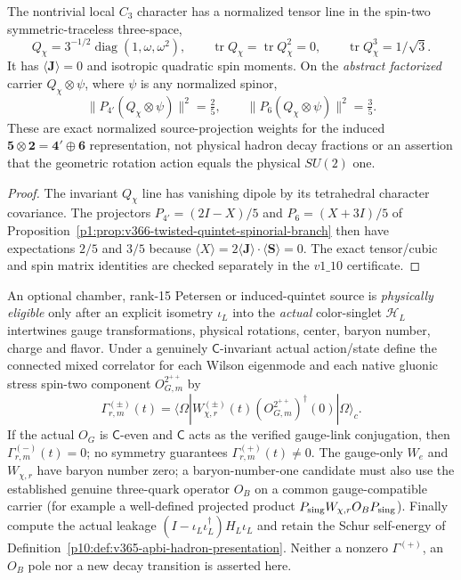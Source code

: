 \documentclass[12pt,a4paper]{article}
\begin{document}
\begin{proposition}
\label{p10:prop:v366-hurwitz-spin2-character-source}
The nontrivial local $C_3$ character has a normalized tensor line
in the spin-two symmetric-traceless three-space,
\[
 Q_{\chi}=3^{-1/2}\operatorname{diag}(1,\omega,\omega^2),\qquad
 \operatorname{tr}Q_{\chi}=
 \operatorname{tr}Q_{\chi}^{2}=0,\qquad
 \operatorname{tr}Q_{\chi}^{3}=1/\sqrt3.
\]
It has $\langle\mathbf J\rangle=0$ and isotropic quadratic spin
moments.  On the \emph{abstract factorized} carrier
$Q_{\chi}\otimes\psi$, where $\psi$ is any normalized spinor,
\[
 \boxed{\|P_{4'}(Q_{\chi}\otimes\psi)\|^2=\tfrac25,
 \qquad\|P_6(Q_{\chi}\otimes\psi)\|^2=\tfrac35}.
\]
These are exact normalized source-projection weights for the
induced $\mathbf5\otimes\mathbf2=\mathbf4'\oplus\mathbf6$
representation, not physical hadron decay fractions or an assertion
that the geometric rotation action equals the physical $SU(2)$ one.
\end{proposition}
\begin{proof}
The invariant $Q_{\chi}$ line has vanishing dipole by
its tetrahedral character covariance.  The projectors
$P_{4'}=(2I-X)/5$ and $P_6=(X+3I)/5$ of
Proposition~\ref{p1:prop:v366-twisted-quintet-spinorial-branch}
then have expectations $2/5$ and $3/5$ because
$\langle X\rangle=2\langle\mathbf J\rangle\cdot
\langle\mathbf S\rangle=0$.  The exact tensor/cubic and spin
matrix identities are checked separately in the $v1\_10$
certificate.
\end{proof}

\begin{definition}
\label{p10:def:v366-hurwitz-stress-baryon-interface}
An optional chamber, rank-15 Petersen or induced-quintet source is
\emph{physically eligible} only after an explicit isometry
$\iota_L$ into the \emph{actual} color-singlet $\mathcal H_L$
intertwines gauge transformations, physical rotations, center,
baryon number, charge and flavor.  Under a genuinely
$\mathsf C$-invariant actual action/state define the connected
mixed correlator for each Wilson eigenmode and each native gluonic
stress spin-two component $O_{G,m}^{2^{++}}$ by
\[
 \Gamma^{(\pm)}_{r,m}(t)=
 \langle\Omega|W^{(\pm)}_{\chi,r}(t)
  (O_{G,m}^{2^{++}})^{\dagger}(0)|\Omega\rangle_c.
\]
If the actual $O_G$ is $\mathsf C$-even and $\mathsf C$ acts as the
verified gauge-link conjugation, then $\Gamma^{(-)}_{r,m}(t)=0$;
no symmetry guarantees $\Gamma^{(+)}_{r,m}(t)\ne0$.
The gauge-only $W_e$ and $W_{\chi,r}$ have baryon number zero;
a baryon-number-one candidate must also use the established
genuine three-quark operator $O_B$ on a common gauge-compatible
carrier (for example a well-defined projected product
$P_{\rm sing}W_{\chi,r}O_BP_{\rm sing}$).
Finally compute the actual leakage
$(I-\iota_L\iota_L^\dagger)H_L\iota_L$ and retain the Schur
self-energy of Definition~\ref{p10:def:v365-apbi-hadron-presentation}.
Neither a nonzero $\Gamma^{(+)}$, an $O_B$ pole nor a
new decay transition is asserted here.
\end{definition}
\end{document}
